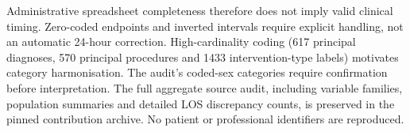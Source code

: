 Administrative spreadsheet completeness therefore does not imply valid
clinical timing. Zero-coded endpoints and inverted intervals require explicit
handling, not an automatic 24-hour correction. High-cardinality coding
(617 principal diagnoses, 570 principal procedures and 1433 intervention-type
labels) motivates category harmonisation. The audit's coded-sex categories
require confirmation before interpretation. The full aggregate source audit,
including variable families, population summaries and detailed LOS discrepancy
counts, is preserved in the pinned contribution archive. No patient or
professional identifiers are reproduced.
